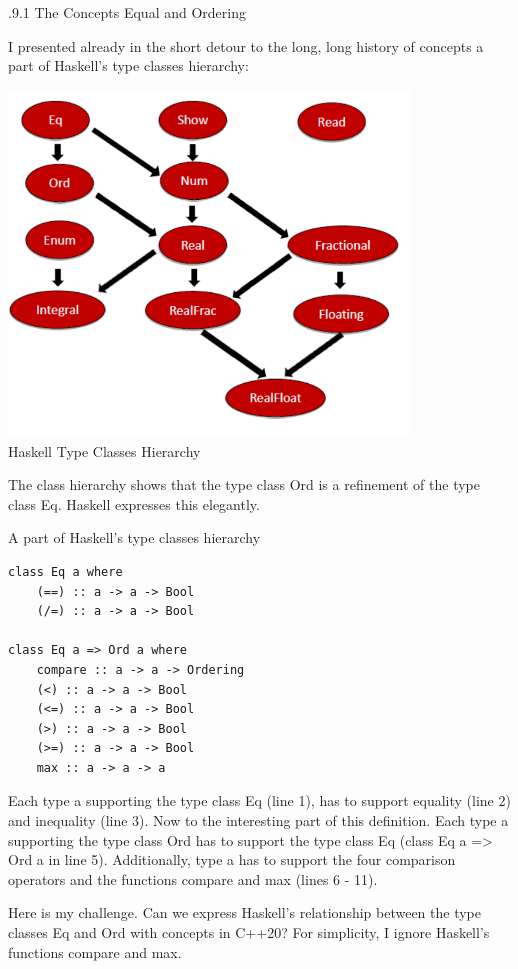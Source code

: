 .9.1\hspace{0.2cm} The Concepts Equal and Ordering

I presented already in the short detour to the long, long history of concepts a part of Haskell’s type classes hierarchy:

\begin{center}
\includegraphics[width=0.8\textwidth]{content/3/chapter4/images/9.png}\\
Haskell Type Classes Hierarchy
\end{center}

The class hierarchy shows that the type class Ord is a refinement of the type class Eq. Haskell expresses this elegantly.

\noindent
A part of Haskell’s type classes hierarchy
\begin{lstlisting}[style=styleCXX]
class Eq a where
	(==) :: a -> a -> Bool
	(/=) :: a -> a -> Bool

class Eq a => Ord a where
	compare :: a -> a -> Ordering
	(<) :: a -> a -> Bool
	(<=) :: a -> a -> Bool
	(>) :: a -> a -> Bool
	(>=) :: a -> a -> Bool
	max :: a -> a -> a
\end{lstlisting}

Each type a supporting the type class Eq (line 1), has to support equality (line 2) and inequality (line 3). Now to the interesting part of this definition. Each type a supporting the type class Ord has to support the type class Eq (class Eq a => Ord a in line 5). Additionally, type a has to support the four comparison operators and the functions compare and max (lines 6 - 11).

Here is my challenge. Can we express Haskell’s relationship between the type classes Eq and Ord with concepts in C++20? For simplicity, I ignore Haskell’s functions compare and max.

